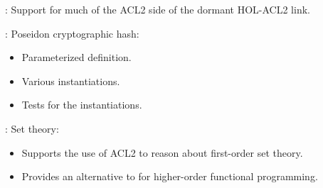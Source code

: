 
\begin{frame}

\newlibtitle

:
Support for much of the ACL2 side of the dormant HOL-ACL2 link.

\end{frame}


\begin{frame}

\newlibtitle

:
Poseidon cryptographic hash:
\begin{itemize}
\item Parameterized definition.
\item Various instantiations.
\item Tests for the instantiations.
\end{itemize}

\end{frame}


\begin{frame}

\newlibtitle

:
Set theory:
\begin{itemize}
\item Supports the use of ACL2 to reason about first-order set theory.
\item Provides an alternative to  for higher-order
      functional programming.
\end{itemize}

\end{frame}


